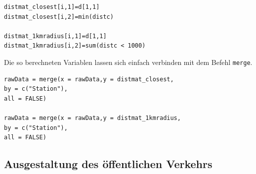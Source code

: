 \documentclass[a4paper,12pt]{thesis}
\begin{document}
\begin{minipage}{\linewidth}
\begin{lstlisting}[caption={Berechnung der Entfernungsvariablen},label=code:dist_variables]
distmat_closest[i,1]=d[1,1]
distmat_closest[i,2]=min(distc)

distmat_1kmradius[i,1]=d[1,1]
distmat_1kmradius[i,2]=sum(distc < 1000)
\end{lstlisting}
\end{minipage}

Die so berechneten Variablen lassen sich einfach verbinden mit dem Befehl \lstinline|merge|.

\begin{minipage}{\linewidth}
\begin{lstlisting}[caption={Füge neue Variablen dem Datensatz hinzu},label=code:dist_variables2]
rawData = merge(x = rawData,y = distmat_closest,
by = c("Station"),
all = FALSE)

rawData = merge(x = rawData,y = distmat_1kmradius,
by = c("Station"),
all = FALSE)
\end{lstlisting}
\end{minipage}

\subsection{Ausgestaltung des öffentlichen Verkehrs}
\end{document}
